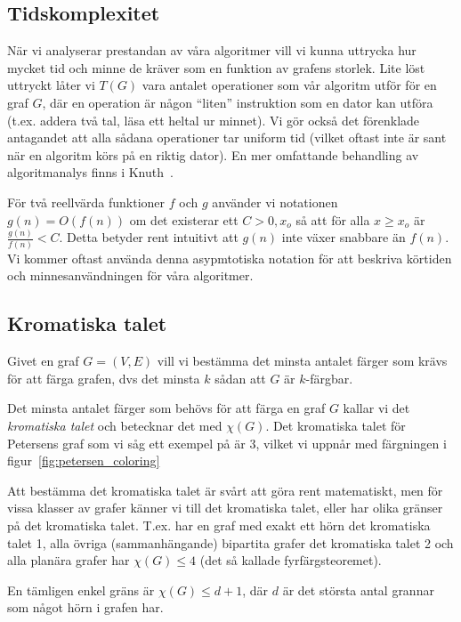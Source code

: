 \documentclass[a4paper]{report}
\begin{document}
\subsection{Tidskomplexitet}

När vi analyserar prestandan av våra algoritmer vill vi kunna uttrycka hur mycket tid och minne de kräver som en funktion av grafens storlek. Lite löst uttryckt
låter vi $T(G)$ vara antalet operationer som vår algoritm utför för en graf $G$, där en operation är någon ``liten'' instruktion som en dator kan utföra (t.ex.
addera två tal, läsa ett heltal ur minnet). Vi gör också det förenklade antagandet att alla sådana operationer tar uniform tid (vilket oftast inte är sant när en algoritm
körs på en riktig dator). En mer omfattande behandling av algoritmanalys finns i Knuth~\cite{Knuth1:1997}.

För två reellvärda funktioner $f$ och $g$ använder vi notationen $g(n) = O(f(n))$ om det existerar ett $C > 0, x_o$ så att för alla $x \ge x_o$ är $\frac{g(n)}{f(n)} < C$. Detta betyder rent intuitivt att $g(n)$
inte växer snabbare än $f(n)$. Vi kommer oftast använda denna asypmtotiska notation för att beskriva körtiden och minnesanvändningen för våra algoritmer.

\subsection{Kromatiska talet}

Givet en graf $G = (V, E)$ vill vi bestämma det minsta antalet färger som krävs för att färga grafen, dvs det minsta $k$ sådan att $G$ är $k$-färgbar.

Det minsta antalet färger som behövs för att färga en graf $G$ kallar vi det \emph{kromatiska talet} och betecknar det med $\chi(G)$. Det kromatiska talet för Petersens graf som vi såg ett exempel på är 3, vilket vi uppnår med färgningen i figur~\ref{fig:petersen_coloring}

Att bestämma det kromatiska talet är svårt att göra rent matematiskt, men för vissa klasser av grafer känner vi till det kromatiska talet, eller har olika
gränser på det kromatiska talet. T.ex. har en graf med exakt ett hörn det kromatiska talet 1, alla övriga (sammanhängande) bipartita grafer det kromatiska talet 2 och alla planära
grafer har $\chi(G)\le 4$ (det så kallade fyrfärgsteoremet).

En tämligen enkel gräns är $\chi(G) \le d + 1$, där $d$ är det största antal grannar som något hörn i grafen har.
\end{document}
